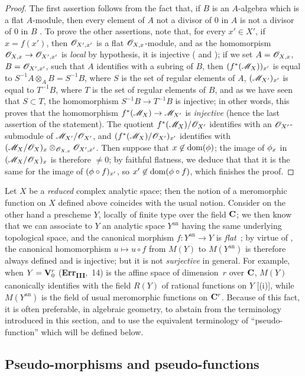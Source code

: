 \begin{proof}
The first assertion follows from the fact that, if $B$ is an $A$-algebra which is a flat $A$-module, then every element of $A$ not a divisor of $0$ in $A$ is not a divisor of $0$ in $B$ .
To prove the other assertions, note that, for every $x'\in X'$, if $x=f(x')$, then $\mathscr{O}_{X',x'}$ is a flat $\mathscr{O}_{X,x}$-module, and as the homomorpism $\sh{O}_{X,x}\to\sh{O}_{X',x'}$ is \emph{local} by hypothesis, it is injective ( and );
if we set $A=\mathscr{O}_{X,x}$, $B=\mathscr{O}_{X',x'}$, such that $A$ identifies with a subring of $B$, then $(f^*(\mathscr{M}_X))_{x'}$ is equal to $S^{-1}A\otimes_A B=S^{-1}B$, where $S$ is the set of regular elements of $A$, $(\mathscr{M}_{X'})_{x'}$ is equal to $T^{-1}B$, where $T$ is the set
of regular elements of $B$, and as we have seen that $S\subset T$, the homomorphism $S^{-1}B\to T^{-1}B$ is injective;
in other words, this proves that the homomorphism  $f^*(\sh{M}_X)\to\sh{M}_{X'}$ is \emph{injective} (hence the last assertion of the statement).
The quotient $f^*(\mathscr{M}_X)/\mathscr{O}_{X'}$ identifies with an $\mathscr{O}_{X'}$-submodule of $\mathscr{M}_{X'}/\mathscr{O}_{X'}$, and $(f^*(\mathscr{M}_X)/\mathscr{O}_{X'})_{x'}$ identifies with $(\mathscr{M}_X/\mathscr{O}_X)_x\otimes_{\mathscr{O}_{X,x}}\mathscr{O}_{X',x'}$.
Then suppose that $x\not\in\operatorname{dom}(\phi)$;
the image of $\phi_x$ in $(\mathscr{M}_X/\mathscr{O}_X)_x$ is therefore $\neq 0$;
by faithful flatness, we deduce that that it is the same for the image of $(\phi\circ f)_{x'}$, so $x'\not\in\operatorname{dom}(\phi\circ f)$, which finishes the proof.
\end{proof}

\begin{remark}[20.1.13]
\label{IV.20.1.13}
Let $X$ be a \emph{reduced} complex analytic space;
then the notion of a meromorphic function on $X$ defined above coincides with the usual notion.
Consider on the other hand a prescheme $Y$, locally of finite type over the field $\mathbf{C}$;
we then know that we can associate to $Y$ an analytic space $Y^\mathrm{an}$ having the same underlying topological space, and the canonical morphism $f:Y^\mathrm{an}\to Y$ is \emph{flat}~\cite{IV-37};
by virtue of , the canonical homomorphism $u\mapsto u\circ f$ from $M(Y)$ to $M(Y^\mathrm{an})$ is therefore always defined and is injective;
but it is not \emph{surjective} in general.
For example, when $Y=\mathbf{V}_0^r$ (\textbf{Err}\textsubscript{\textbf{III}},~14) is the affine space of dimension~$r$ over $\mathbf{C}$, $M(Y)$ canonically identifies with the field $R(Y)$ of rational functions on $Y$ [(i)], while $M(Y^\mathrm{an})$ is the field of usual meromorphic functions on $\mathbf{C}^r$.
Because of this fact, it is often preferable, in algebraic geometry, to abstain from the terminology introduced in this section, and to use the equivalent terminology of ``pseudo-function'' which will be defined below.
\end{remark}

\subsection{Pseudo-morphisms and pseudo-functions}
\label{IV.20.2}

